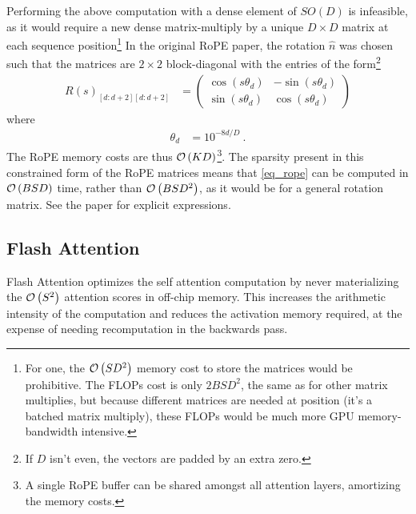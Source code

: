 \documentclass[11pt]{article}
\begin{document}
Performing the above computation with a dense element of $ SO(D) $ is infeasible, as it would
require a new dense matrix-multiply by a unique $ D \times D $ matrix at each sequence
position\footnote{For one, the $ \mathcal{O} \left( SD ^{ 2 } \right)  $ memory cost to store the matrices
    would be prohibitive. The FLOPs cost is only $ 2BSD ^{ 2 } $, the same as for other matrix
multiplies, but because different matrices are needed at position (it's a batched matrix multiply),
these FLOPs would be much more GPU memory-bandwidth intensive.} In the original RoPE paper, the
rotation $ \hat{n} $ was chosen such that the matrices are $ 2 \times  2 $ block-diagonal with the
entries of the form\footnote{If $ D $ isn't even, the vectors are padded by an extra zero.}
\begin{align}
	R(s)_{ [d:d+2][d:d+2] } & =\begin{pmatrix}
		                           \cos \left ( s \theta _{ d }   \right ) & -\sin \left ( s \theta _{ d }   \right ) \\
		                           \sin \left ( s \theta _{ d }   \right ) & \cos \left ( s \theta _{ d }   \right )
	                           \end{pmatrix}
\end{align}
where
\begin{align}
	\theta _{ d } & = 10 ^{ -8d/D   } \ .
\end{align}
The RoPE memory costs are thus $ \mathcal{O} \left( K D \right)  $\footnote{A single RoPE buffer can be
shared amongst all attention layers, amortizing the memory costs.}. The sparsity present in this constrained form of the RoPE matrices means that
\eqref{eq_rope} can be computed in $ \mathcal{O} \left( BSD \right)  $ time, rather than $ \mathcal{O} \left(
BSD ^{ 2 } \right)$, as it would be for a general rotation matrix. See the paper for explicit
expressions.


\subsection{Flash Attention \label{subsec_flash_attention}}


Flash Attention \cite{dao2022flashattention, dao2023flashattention2} optimizes the self attention
computation by never materializing the $ \mathcal{O} \left( S ^{ 2 } \right)  $ attention scores in
off-chip memory. This increases the arithmetic intensity of the computation and reduces the
activation memory required, at the expense of needing recomputation in the backwards pass.
\end{document}
